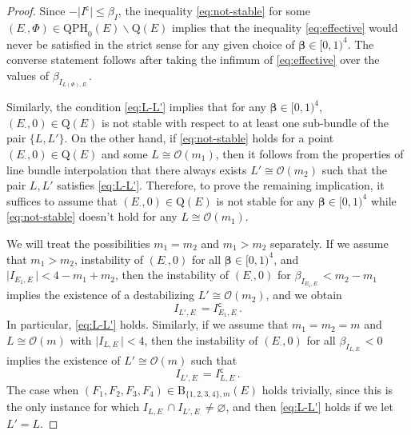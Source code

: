 \documentclass[pdftex]{sigma}
\newcommand{\calO}{\mathcal{O}}
\newcommand{\qp}{\boldsymbol{\cdot}}
\numberwithin{equation}{section}
\begin{document}
\begin{proof}
Since $-\vert I^{\mathsf{c}}\vert\leq \beta_{I}$, the inequality \eqref{eq:not-stable} for some $(E_{\qp},\Phi)\in\mathrm{QPH}_{0}(E)\backslash\mathrm{Q}(E)$ implies that the inequality \eqref{eq:effective} would never be satisfied in the strict sense for any given choice of $\pmb{\beta}\in[0,1)^{4}$. The converse statement follows after taking the infimum of \eqref{eq:effective} over the values of $\beta_{I_{L(\Phi),E_{\qp}}}$.

Similarly, the condition \eqref{eq:L-L'} implies that for any $\pmb{\beta}\in[0,1)^{4}$, $(E_{\qp},0)\in\mathrm{Q}(E)$ is not stable with respect to at least one sub-bundle of the pair $\{L,L'\}$. On the other hand, if \eqref{eq:not-stable} holds for a point $(E_{\qp},0)\in\mathrm{Q}(E)$ and some $L\cong \calO(m_{1})$, then it follows from the properties of line bundle interpolation that there always exists $L'\cong \calO(m_{2})$ such that the pair $L,L'$ satisfies \eqref{eq:L-L'}. Therefore, to prove the remaining implication, it suffices to assume that $(E_{\qp},0)\in\mathrm{Q}(E)$ is not stable for any $\pmb{\beta}\in[0,1)^{4}$ while \eqref{eq:not-stable} doesn't hold for any $L\cong \calO(m_{1})$.

We will treat the possibilities $m_{1}=m_{2}$ and $m_{1}>m_{2}$ separately. If we assume that $m_{1}>m_{2}$, instability of $(E_{\qp},0)$ for all $\pmb{\beta}\in[0,1)^{4}$, and $\vert I_{E_{1},E_{\qp}}\vert < 4 -m_{1}+m_{2}$, then the instability of $(E_{\qp},0)$ for $\beta_{I_{E_{1},E_{\qp}}} < m_{2}-m_{1}$ implies the existence of a destabilizing $L'\cong\calO(m_{2})$, and we obtain
\[
I_{L',E_{\qp}} = I^{\mathsf{c}}_{E_{1},E_{\qp}}.
\]
In particular, \eqref{eq:L-L'} holds. Similarly, if we assume that $m_{1}=m_{2}=m$ and $L\cong\calO(m)$ with $\vert I_{L,E_{\qp}}\vert <4$, then the instability of $(E_{\qp},0)$ for all $\beta_{I_{L,E_{\qp}}} < 0$ implies the existence of $L'\cong \calO(m)$ such that
\[
I_{L',E_{\qp}} = I^{\mathsf{c}}_{L,E_{\qp}}.
\]
The case when $(F_{1},F_{2},F_{3},F_{4})\in\mathrm{B}_{\{1,2,3,4\},m}(E)$ holds trivially, since this is the only instance for which $I_{L,E_{\qp}}\cap I_{L',E_{\qp}} \neq\varnothing $, and then \eqref{eq:L-L'} holds if we let $L' = L$.
\end{proof}
\end{document}
